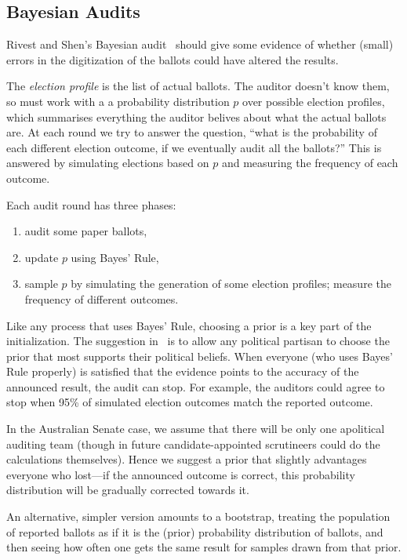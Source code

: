 \documentclass[10pt,a4paper]{article}
\begin{document}
\subsection{Bayesian Audits} Rivest and Shen's Bayesian audit~\cite{rivest2012bayesian} should give some evidence of whether (small) errors in the digitization of the ballots could have altered the results. 

The \emph{election profile} is the list of actual ballots. The auditor doesn't know them, so must work with a a probability distribution $p$ over possible election profiles, which summarises everything the auditor belives about what the actual ballots are.  At each round we try to answer the question, ``what is the probability of each different election outcome, if we eventually audit all the ballots?''  This is answered by simulating elections based on $p$ and measuring the frequency of each outcome. 

 Each audit round has three phases:
\begin{enumerate}
\item audit some paper ballots,
\item update $p$ using Bayes' Rule,
\item sample $p$ by simulating the generation of some election profiles; measure the frequency of different outcomes.
\end{enumerate}


Like any process that uses Bayes' Rule, choosing a prior is a key part of the initialization.  The suggestion in~\cite{rivest2012bayesian} is to allow any political partisan to choose the prior that most supports their political beliefs.  When everyone (who uses Bayes' Rule properly) is satisfied that the evidence points to the accuracy of the announced result, the audit can stop.  For example, the auditors could agree to stop when 95\% of simulated election outcomes match the reported outcome.


In the Australian Senate case, we assume that there will be only one apolitical auditing team (though in future candidate-appointed scrutineers could do the calculations themselves).  Hence we suggest a prior that slightly advantages everyone who lost---if the announced outcome is correct, this probability distribution will be gradually corrected towards it.

An alternative, simpler version amounts to a bootstrap, treating the population of reported ballots as
if it is the (prior) probability distribution of ballots, and then seeing how often one gets the same result for samples drawn from that prior.  
\end{document}
